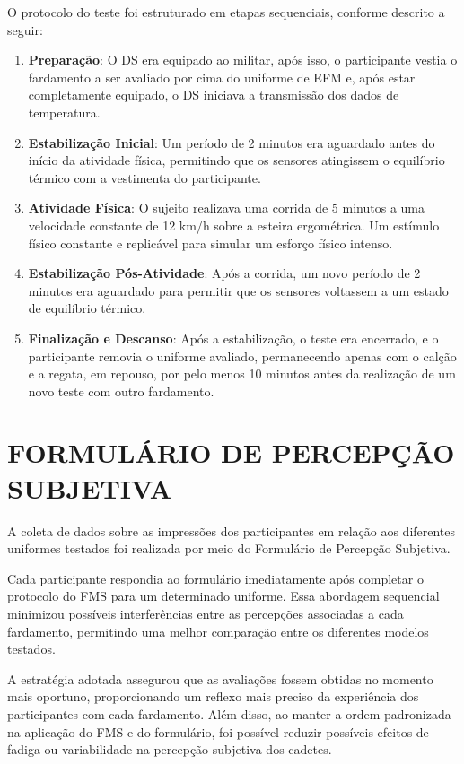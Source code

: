 O protocolo do teste foi estruturado em etapas sequenciais, conforme descrito a seguir:
\begin{enumerate}
    \item \textbf{Preparação}: O \acrlong{DS} era equipado ao militar, após isso, o participante vestia o fardamento a ser avaliado por cima do uniforme de \acrshort{EFM} e, após estar completamente equipado, o DS iniciava a transmissão dos dados de temperatura.
    \item \textbf{Estabilização Inicial}: Um período de 2 minutos era aguardado antes do início da atividade física, permitindo que os sensores atingissem o equilíbrio térmico com a vestimenta do participante.
    \item \textbf{Atividade Física}: O sujeito realizava uma corrida de 5 minutos a uma velocidade constante de 12 km/h sobre a esteira ergométrica. Um estímulo físico constante e replicável para simular um esforço físico intenso.
    \item \textbf{Estabilização Pós-Atividade}: Após a corrida, um novo período de 2 minutos era aguardado para permitir que os sensores voltassem a um estado de equilíbrio térmico.
    \item \textbf{Finalização e Descanso}: Após a estabilização, o teste era encerrado, e o participante removia o uniforme avaliado, permanecendo apenas com o calção e a regata, em repouso, por pelo menos 10 minutos antes da realização de um novo teste com outro fardamento.
\end{enumerate}


\section{FORMULÁRIO DE PERCEPÇÃO SUBJETIVA}

A coleta de dados sobre as impressões dos participantes em relação aos diferentes uniformes testados foi realizada por meio do Formulário de Percepção Subjetiva. %

\tab Cada participante respondia ao formulário imediatamente após completar o protocolo do \acrshort{FMS} para um determinado uniforme. Essa abordagem sequencial minimizou possíveis interferências entre as percepções associadas a cada fardamento, permitindo uma melhor comparação entre os diferentes modelos testados.

A estratégia adotada assegurou que as avaliações fossem obtidas no momento mais oportuno, proporcionando um reflexo mais preciso da experiência dos participantes com cada fardamento. Além disso, ao manter a ordem padronizada na aplicação do \acrshort{FMS} e do formulário, foi possível reduzir possíveis efeitos de fadiga ou variabilidade na percepção subjetiva dos cadetes.